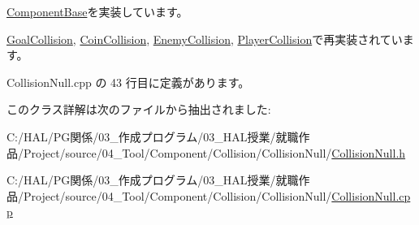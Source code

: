\mbox{\hyperlink{class_component_base_a58e66d65bc8f3cd5ab67b4b2deab4fc2}{Component\+Base}}を実装しています。



\mbox{\hyperlink{class_goal_collision_a1e3995dc2f5ba2678580d06699ca6936}{Goal\+Collision}}, \mbox{\hyperlink{class_coin_collision_a981fd9b1b8c688a757a456a56d80501b}{Coin\+Collision}}, \mbox{\hyperlink{class_enemy_collision_ab54133504d867c6d2070d2f3854a0aaf}{Enemy\+Collision}}, \mbox{\hyperlink{class_player_collision_a09f97f220903f5724a3af6b97af3a336}{Player\+Collision}}で再実装されています。



 Collision\+Null.\+cpp の 43 行目に定義があります。



このクラス詳解は次のファイルから抽出されました\+:\begin{DoxyCompactItemize}
\item 
C\+:/\+H\+A\+L/\+P\+G関係/03\+\_\+作成プログラム/03\+\_\+\+H\+A\+L授業/就職作品/\+Project/source/04\+\_\+\+Tool/\+Component/\+Collision/\+Collision\+Null/\mbox{\hyperlink{_collision_null_8h}{Collision\+Null.\+h}}\item 
C\+:/\+H\+A\+L/\+P\+G関係/03\+\_\+作成プログラム/03\+\_\+\+H\+A\+L授業/就職作品/\+Project/source/04\+\_\+\+Tool/\+Component/\+Collision/\+Collision\+Null/\mbox{\hyperlink{_collision_null_8cpp}{Collision\+Null.\+cpp}}\end{DoxyCompactItemize}
